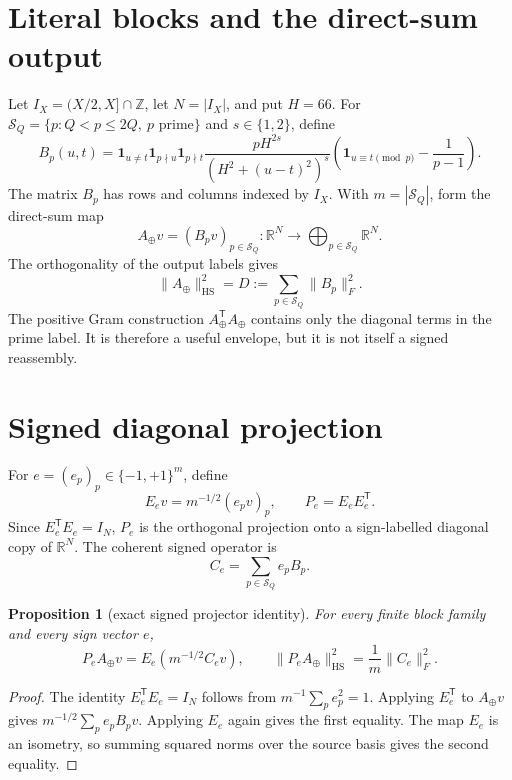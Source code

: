 \documentclass[10pt]{article}
\newtheorem{proposition}{Proposition}
\newcommand{\HS}{\operatorname{HS}}
\newcommand{\R}{\mathbb R}
\begin{document}
\section{Literal blocks and the direct-sum output}

Let $I_X=(X/2,X]\cap\mathbb Z$, let $N=|I_X|$, and put $H=66$.  For
$\mathcal S_Q=\{p:Q<p\leq2Q,\ p\text{ prime}\}$ and $s\in\{1,2\}$, define
\begin{equation}
 B_p(u,t)=\mathbf 1_{u\ne t}\mathbf 1_{p\nmid u}\mathbf 1_{p\nmid t}
 \frac{pH^{2s}}{(H^2+(u-t)^2)^s}
 \left(\mathbf 1_{u\equiv t\pmod p}-\frac{1}{p-1}\right).
 \label{eq:block}
\end{equation}
The matrix $B_p$ has rows and columns indexed by $I_X$.  With
$m=|\mathcal S_Q|$, form the direct-sum map
\begin{equation}
 A_\oplus v=(B_pv)_{p\in\mathcal S_Q}:
 \R^N\longrightarrow\bigoplus_{p\in\mathcal S_Q}\R^N.
 \label{eq:direct}
\end{equation}
The orthogonality of the output labels gives
\begin{equation}
 \|A_\oplus\|_{\HS}^2=D:=\sum_{p\in\mathcal S_Q}\|B_p\|_F^2.
 \label{eq:direct-energy}
\end{equation}
The positive Gram construction $A_\oplus^{\mathsf T}A_\oplus$ contains only
the diagonal terms in the prime label.  It is therefore a useful envelope,
but it is not itself a signed reassembly.

\section{Signed diagonal projection}

For $e=(e_p)_p\in\{-1,+1\}^m$, define
\begin{equation}
 E_ev=m^{-1/2}(e_pv)_p,
 \qquad P_e=E_eE_e^{\mathsf T}.
 \label{eq:projector}
\end{equation}
Since $E_e^{\mathsf T}E_e=I_N$, $P_e$ is the orthogonal projection onto a
sign-labelled diagonal copy of $\R^N$.  The coherent signed operator is
\begin{equation}
 C_e=\sum_{p\in\mathcal S_Q}e_pB_p.
 \label{eq:coherent}
\end{equation}

\begin{proposition}[exact signed projector identity]
For every finite block family and every sign vector $e$,
\begin{equation}
 P_eA_\oplus v=E_e(m^{-1/2}C_ev),
 \qquad
 \|P_eA_\oplus\|_{\HS}^2=\frac1m\|C_e\|_F^2.
 \label{eq:identity}
\end{equation}
\end{proposition}
\begin{proof}
The identity $E_e^{\mathsf T}E_e=I_N$ follows from
$m^{-1}\sum_pe_p^2=1$.  Applying $E_e^{\mathsf T}$ to
$A_\oplus v$ gives $m^{-1/2}\sum_pe_pB_pv$.  Applying $E_e$ again gives
the first equality.  The map $E_e$ is an isometry, so summing squared norms
over the source basis gives the second equality.
\end{proof}
\end{document}
